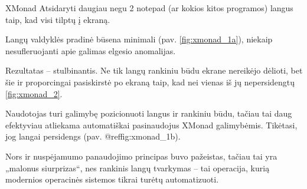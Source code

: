 \begin{xcase}{XMonad}
  \xcgoal
  {
    Atsidaryti daugiau negu 2 notepad (ar kokios kitos programos) langus taip, kad visi 
    tilptų į ekraną.
  }
  
  \xctools
  {
    Langų valdyklės pradinė būsena minimali (pav. \ref{fig:xmonad_1a}), niekaip nesufleruojanti apie galimas elgesio
    anomalijas.
    {
    }
  }
  
  \xcresult
  {
    Rezultatas – stulbinantis. Ne tik langų rankiniu būdu ekrane nereikėjo dėlioti, bet šie
    ir proporcingai pasiskirstė po ekraną taip, kad nei vienas iš jų nepersidengtų \ref{fig:xmonad_2}.
  }
  
  \xcprinciples
  {
    {
      Naudotojas turi galimybę pozicionuoti langus ir rankiniu būdu, tačiau tai daug efektyviau
      atliekama automatiškai pasinaudojus XMonad galimybėmis.
    }
    {
      Tikėtasi, jog langai persidengs (pav. @ref{fig:xmonad_1b}).
    }
  }
  
  \xcthoughts
  {
    Nors ir nuspėjamumo panaudojimo principas buvo pažeistas, tačiau tai yra „malonus 
    siurprizas“, nes rankinis langų tvarkymas – tai operacija, kurią modernios operacinės
    sistemos tikrai turėtų automatizuoti.
  }
\end{xcase}
